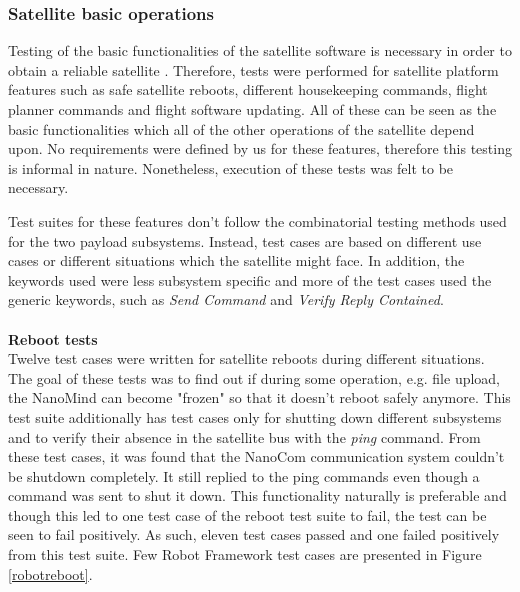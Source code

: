 \documentclass[english,12pt,a4paper,pdftex,elec,utf8]{aaltothesis}
\begin{document}
\subsubsection{Satellite basic operations}
Testing of the basic functionalities of the satellite software is necessary in order to obtain a reliable satellite \cite{Swart1, smallsatconf31, ecss}. Therefore, tests were performed for satellite platform features such as safe satellite reboots, different housekeeping commands, flight planner commands and flight software updating. All of these can be seen as the basic functionalities which all of the other operations of the satellite depend upon. No requirements were defined by us for these features, therefore this testing is informal in nature. Nonetheless, execution of these tests was felt to be necessary.\par 
Test suites for these features don't follow the combinatorial testing methods used for the two payload subsystems. Instead, test cases are based on different use cases or different situations which the satellite might face. In addition, the keywords used were less subsystem specific and more of the test cases used the generic keywords, such as \textit{Send Command} and \textit{Verify Reply Contained}.\\
\\
\textbf{Reboot tests}
\\
Twelve test cases were written for satellite reboots during different situations. The goal of these tests was to find out if during some operation, e.g. file upload, the NanoMind can become "frozen" so that it doesn't reboot safely anymore. This test suite additionally has test cases only for shutting down different subsystems and to verify their absence in the satellite bus with the \textit{ping} command. From these test cases, it was found that the NanoCom communication system couldn't be shutdown completely. It still replied to the ping commands even though a command was sent to shut it down. This functionality naturally is preferable and though this led to one test case of the reboot test suite to fail, the test can be seen to fail positively. As such, eleven test cases passed and one failed positively from this test suite. Few Robot Framework test cases are presented in Figure \ref{robotreboot}. \par
\end{document}
